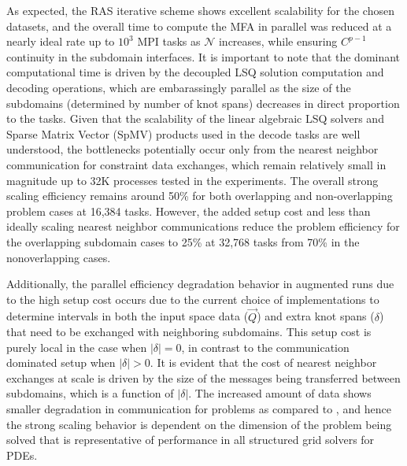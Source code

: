 As expected, the RAS iterative scheme shows excellent scalability for the chosen datasets, and the overall time to compute the MFA in parallel was reduced at a nearly ideal rate up to $10^3$ MPI tasks as $\mathcal{N}$ increases, while ensuring $C^{p-1}$ continuity in the subdomain interfaces.  It is important to note that the dominant computational time is driven by the decoupled LSQ solution computation and decoding operations, which are embarassingly parallel as the size of the subdomains (determined by number of knot spans) decreases in direct proportion to the tasks. Given that the scalability of the linear algebraic LSQ solvers \cite{benzi2002, dalcin2011} and Sparse Matrix Vector (SpMV) products used in the decode tasks are well understood, the bottlenecks potentially occur only from the nearest neighbor communication for constraint data exchanges, which remain relatively small in magnitude up to 32K processes tested in the  experiments. The overall strong scaling efficiency remains around 50\% for both overlapping and non-overlapping  problem cases at 16,384 tasks. However, the added setup cost and less than ideally scaling nearest neighbor communications reduce the  problem efficiency for the overlapping subdomain cases to 25\% at 32,768 tasks from 70\% in the nonoverlapping cases. 

Additionally, the parallel efficiency degradation behavior in augmented runs due to the high setup cost occurs due to the current choice of implementations to determine intervals in both the input space data ($\vec{Q}$) and extra knot spans ($\delta$) that need to be exchanged with neighboring subdomains. This setup cost is purely local in the case when $\left| \delta \right|=0$, in contrast to the communication dominated setup when $\left| \delta \right| > 0$. 
It is evident that the cost of nearest neighbor exchanges at scale is driven by the size of the messages being transferred between subdomains, which is a function of $\left| \delta \right|$. The increased amount of data shows smaller degradation in communication for  problems as compared to , and hence the strong scaling behavior is dependent on the dimension of the problem being solved that is representative of performance in all structured grid solvers for PDEs.



